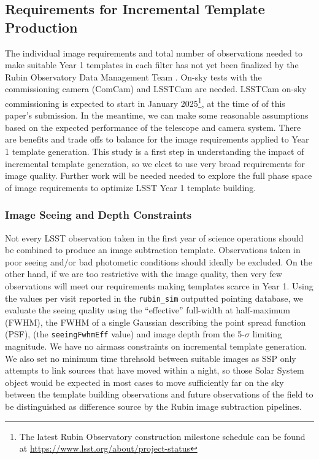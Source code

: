 \documentclass[preprint,linenumbers]{aastex631}
\begin{document}
	\subsection{Requirements for Incremental Template Production}
	The individual image requirements and total number of observations needed to make suitable Year 1 templates in each filter has not yet been finalized by the Rubin Observatory Data Management Team \citep{DMTN-107,RTN-011}. On-sky tests with the commissioning camera (ComCam) and LSSTCam are needed. LSSTCam on-sky commissioning is expected to start in January 2025\footnote{The latest Rubin Observatory construction milestone schedule can be found at \url{https://www.lsst.org/about/project-status}}, at the time of of this paper's submission. In the meantime, we can make some reasonable assumptions based on the expected performance of the telescope and camera system. There are benefits and trade offs to balance for the image requirements applied to Year 1 template generation. This study is a first step in understanding the impact of incremental template generation,  so we elect to use very broad requirements for image quality. Further work will be needed needed to explore the full phase space of image requirements to optimize LSST Year 1 template building. 
	
	\subsubsection{Image Seeing and Depth Constraints}
	\label{sec:imageqa}
	Not every LSST observation taken in the first year of science operations should be combined to produce an image subtraction template. Observations taken in  poor seeing and/or bad photometic conditions should ideally be excluded. 
	On the other hand, if we are too restrictive with the image quality, then very few observations will meet our requirements making templates scarce in Year 1.  
	Using the values per visit reported in the \texttt{rubin\_sim} outputted pointing database, we evaluate the seeing quality  using the ``effective” full-width at half-maximum (FWHM), the FWHM of a single Gaussian describing the point spread function (PSF), (the \texttt{seeingFwhmEff} value) and image depth from the 5-$\sigma$ limiting magnitude. 
	We have no airmass constraints on incremental template generation. We also set no minimum time threhsold between suitable images as SSP only attempts to link sources that have moved within a night, so those Solar System object would be expected in most cases to move sufficiently far on the sky between the template building observations and future observations of the field to be distinguished as difference source by the Rubin image subtraction pipelines. 
	
\end{document}
